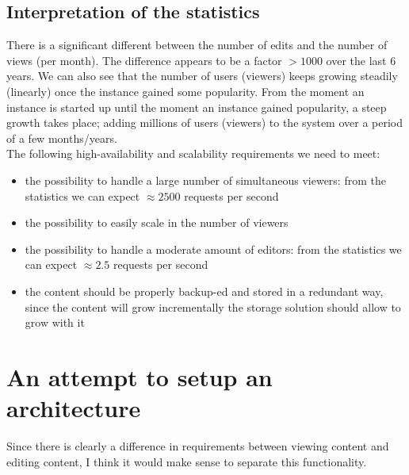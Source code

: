 \documentclass[12pt]{report}
\begin{document}
\subsection{Interpretation of the statistics}
There is a significant different between the number of edits and the
number of views (per month).
The difference appears to be a factor $>1000$ over the last 6 years.
We can also see that the number of users (viewers) keeps growing
steadily (linearly) once the instance gained some popularity. 
From the moment an instance is started up until the moment an
instance gained popularity, a steep growth takes place; adding
millions of users (viewers) to the system over a period of a few
months/years.\\
The following high-availability and scalability requirements we need to meet:
\begin{itemize}
\item the possibility to handle a large number of
  simultaneous viewers: from the statistics we can expect $\approx 2500$
  requests per second
\item the possibility to easily scale in the number of viewers
\item the possibility to handle a moderate amount of editors: from the
  statistics we can expect $\approx 2.5$ requests per second
\item the content should be properly backup-ed and stored in a
  redundant way, since the content will grow incrementally the storage
  solution should allow to grow with it
\end{itemize}

\section{An attempt to setup an architecture}
Since there is clearly a difference in requirements between viewing content and
editing content, I think it would make sense to separate this
functionality.
\end{document}
